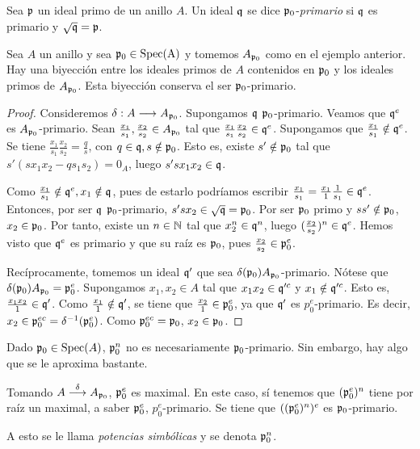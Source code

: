 \documentclass[../main.tex]{subfiles}
\begin{document}
\begin{definition}
Sea $\mathfrak{p}$ un ideal primo de un anillo $A$. Un ideal $\mathfrak{q}$ se dice $\mathfrak{p}_0$-\textit{primario} si $\mathfrak{q}$ es primario y $\sqrt{\mathfrak{q}}=\mathfrak{p}$.
\end{definition}
\begin{proposition}
Sea $A$ un anillo y sea $\mathfrak{p}_0\in \operatorname{Spec(A)}$ y tomemos $A_{\mathfrak{p}_0}$ como en el ejemplo anterior. Hay una biyección entre los ideales primos de $A$ contenidos en $\mathfrak{p}_0$ y los ideales primos de $A_{\mathfrak{p}_0}$. Esta biyección conserva el ser $\mathfrak{p}_0$-primario.
\end{proposition}
\begin{proof}
Consideremos $\delta:A\longrightarrow A_{\mathfrak{p}_0}$. Supongamos $\mathfrak{q}$ $\mathfrak{p}_0$-primario. Veamos que $\mathfrak{q}^e$ es $A_{\mathfrak{p}_0}$-primario. Sean $\frac{x_1}{s_1},\frac{x_2}{s_2}\in A_{\mathfrak{p}_0}$ tal que $\frac{x_1}{s_1}\frac{x_2}{s_2}\in\mathfrak{q}^e$. Supongamos que $\frac{x_1}{s_1}\notin\mathfrak{q}^e$. Se tiene $\frac{x_1}{s_1}\frac{x_2}{s_2}=\frac{q}{s}$, con $q\in\mathfrak{q}, s\notin\mathfrak{p}_0$. Esto es, existe $s'\notin\mathfrak{p}_0$ tal que $s'(sx_1x_2-qs_1s_2)=0_A$, luego $s'sx_1x_2\in\mathfrak{q}$.

Como $\frac{x_1}{s_1}\notin \mathfrak{q}^e, x_1\notin\mathfrak{q}$, pues de estarlo podríamos escribir $\frac{x_1}{s_1}=\frac{x_1}{1}\frac{1}{s_1}\in\mathfrak{q}^e$. Entonces, por ser $\mathfrak{q}$ $\mathfrak{p}_0$-primario, $s'sx_2\in\sqrt{\mathfrak{q}}=\mathfrak{p}_0$. Por ser $\mathfrak{p}_0$ primo y $ss'\notin\mathfrak{p}_0$, $x_2\in\mathfrak{p}_0$. Por tanto, existe un $n\in\mathbb{N}$ tal que $x_2^n\in\mathfrak{q}^n$, luego $(\frac{x_2}{s_2})^n\in\mathfrak{q}^e$. Hemos visto que $\mathfrak{q}^e$ es primario y que su raíz es $\mathfrak{p}_0$, pues $\frac{x_2}{s_2}\in\mathfrak{p}_0^e$.

Recíprocamente, tomemos un ideal $\mathfrak{q}'$ que sea $\delta(\mathfrak{p}_0)A_{\mathfrak{p}_0}$-primario. Nótese que $\delta(\mathfrak{p}_0)A_{\mathfrak{p}_0}=\mathfrak{p}_0^e$. Supongamos $x_1,x_2\in A$ tal que $x_1x_2\in\mathfrak{q}'^c$ y $x_1\notin\mathfrak{q}'^c$. Esto es, $\frac{x_1x_2}{1}\in\mathfrak{q}'$. Como $\frac{x_1}{1}\notin\mathfrak{q}'$, se tiene que $\frac{x_2}{1}\in\mathfrak{p}_0^e$, ya que $\mathfrak{q}'$ es $p_0^e$-primario. Es decir, $x_2\in\mathfrak{p}_0^{ec}= \delta^{-1}(\mathfrak{p}_0^e)$. Como $\mathfrak{p}_0^{ec}=\mathfrak{p}_0$, $x_2\in\mathfrak{p}_0$.
\end{proof}
\begin{remark}
Dado $\mathfrak{p}_0\in\operatorname{Spec}(A)$, $\mathfrak{p}_0^n$ no es necesariamente $\mathfrak{p}_0$-primario. Sin embargo, hay algo que se le aproxima bastante.

Tomando $A\overset{\delta}{\longrightarrow}A_{\mathfrak{p}_0}$, $\mathfrak{p}_0^e$ es maximal. En este caso, sí tenemos que $(\mathfrak{p}_0^e)^n$ tiene por raíz un maximal, a saber $\mathfrak{p}_0^e$, $p_0^e$-primario. Se tiene que $((\mathfrak{p}_0^e)^n)^e$ es $\mathfrak{p}_0$-primario.

A esto se le llama \textit{potencias simbólicas} y se denota $\mathfrak{p}_0^n$.
\end{remark}
\end{document}
